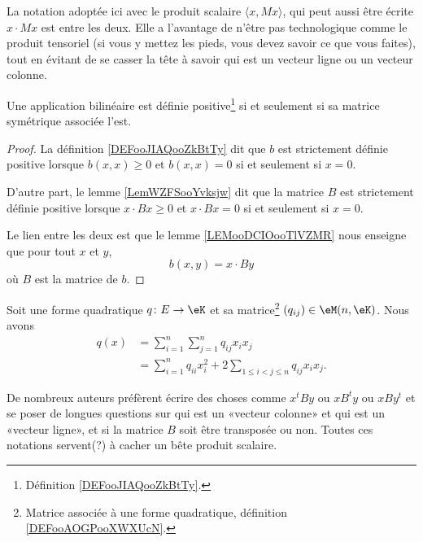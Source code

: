 La notation adoptée ici avec le produit scalaire \( \langle x, Mx\rangle \), qui peut aussi être écrite \( x\cdot Mx\) est entre les deux. Elle a l'avantage de n'être pas technologique comme le produit tensoriel (si vous y mettez les pieds, vous devez savoir ce que vous faites), tout en évitant de se casser la tête à savoir qui est un vecteur ligne ou un vecteur colonne.

\begin{proposition}     \label{PROPooUAAFooEGVDRC} \label{PROPooNQSXooVMFAtU}
	Une application bilinéaire est définie positive\footnote{Définition \ref{DEFooJIAQooZkBtTy}.} si et seulement si sa matrice symétrique associée l'est.
\end{proposition}

\begin{proof}
	La définition \ref{DEFooJIAQooZkBtTy} dit que \( b\) est strictement définie positive lorsque \( b(x,x)\geq 0\) et \( b(x,x)=0\) si et seulement si \( x=0\).

	D'autre part, le lemme \ref{LemWZFSooYvksjw} dit que la matrice \( B\) est strictement définie positive lorsque \( x\cdot Bx\geq 0\) et \( x\cdot Bx=0\) si et seulement si \( x=0\).

	Le lien entre les deux est que le lemme \ref{LEMooDCIOooTlVZMR} nous enseigne que pour tout \( x\) et \( y\),
	\begin{equation}
		b(x,y)=x\cdot By
	\end{equation}
	où \( B\) est la matrice de \( b\).
\end{proof}

\begin{proposition}     \label{PROPooCIEUooODqfwm}
	Soit une forme quadratique \( q\colon E\to \eK\) et sa matrice\footnote{Matrice associée à une forme quadratique, définition \ref{DEFooAOGPooXWXUcN}.} \( (q_{ij})\in \eM(n,\eK)\). Nous avons
	\begin{subequations}        \label{SUBEQSooEHVXooJjKLqyiB}
		\begin{align}
			q(x) & =\sum_{i=1}^n\sum_{j=1}^nq_{ij}x_ix_j                          \\
			     & =\sum_{i=1}^nq_{ii}x_i^2+2\sum_{1\leq i <j\leq n}q_{ij}x_ix_j.
		\end{align}
	\end{subequations}
\end{proposition}

\begin{normaltext}
	De nombreux auteurs préfèrent écrire des choses comme \( x^tBy\) ou \( xB^ty\) ou \( xBy^t\) et se poser de longues questions sur qui est un «vecteur colonne» et qui est un «vecteur ligne», et si la matrice \( B\) soit être transposée ou non. Toutes ces notations servent(?) à cacher un bête produit scalaire.
\end{normaltext}


